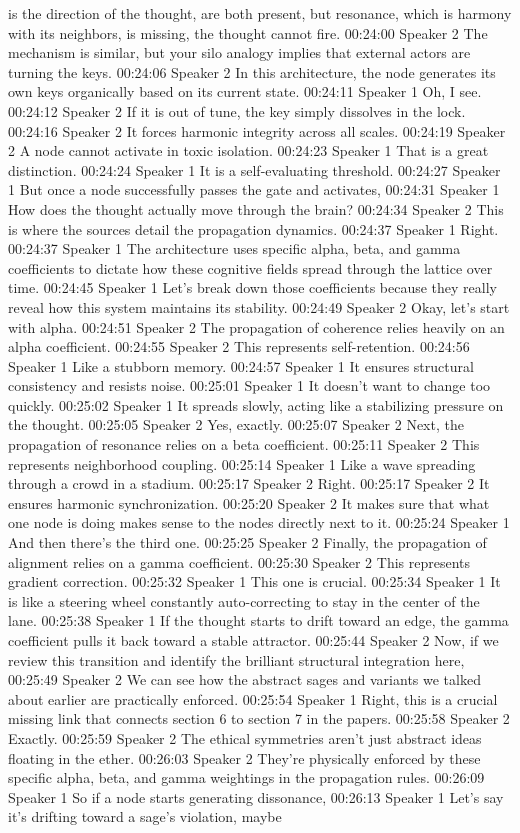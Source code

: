 is the direction of the thought, are both present, but resonance, which is harmony with its neighbors, is missing, the thought cannot fire. 00:24:00 Speaker 2 The mechanism is similar, but your silo analogy implies that external actors are turning the keys. 00:24:06 Speaker 2 In this architecture, the node generates its own keys organically based on its current state. 00:24:11 Speaker 1 Oh, I see. 00:24:12 Speaker 2 If it is out of tune, the key simply dissolves in the lock. 00:24:16 Speaker 2 It forces harmonic integrity across all scales. 00:24:19 Speaker 2 A node cannot activate in toxic isolation. 00:24:23 Speaker 1 That is a great distinction. 00:24:24 Speaker 1 It is a self-evaluating threshold. 00:24:27 Speaker 1 But once a node successfully passes the gate and activates, 00:24:31 Speaker 1 How does the thought actually move through the brain? 00:24:34 Speaker 2 This is where the sources detail the propagation dynamics. 00:24:37 Speaker 1 Right. 00:24:37 Speaker 1 The architecture uses specific alpha, beta, and gamma coefficients to dictate how these cognitive fields spread through the lattice over time. 00:24:45 Speaker 1 Let's break down those coefficients because they really reveal how this system maintains its stability. 00:24:49 Speaker 2 Okay, let's start with alpha. 00:24:51 Speaker 2 The propagation of coherence relies heavily on an alpha coefficient. 00:24:55 Speaker 2 This represents self-retention. 00:24:56 Speaker 1 Like a stubborn memory. 00:24:57 Speaker 1 It ensures structural consistency and resists noise. 00:25:01 Speaker 1 It doesn't want to change too quickly. 00:25:02 Speaker 1 It spreads slowly, acting like a stabilizing pressure on the thought. 00:25:05 Speaker 2 Yes, exactly. 00:25:07 Speaker 2 Next, the propagation of resonance relies on a beta coefficient. 00:25:11 Speaker 2 This represents neighborhood coupling. 00:25:14 Speaker 1 Like a wave spreading through a crowd in a stadium. 00:25:17 Speaker 2 Right. 00:25:17 Speaker 2 It ensures harmonic synchronization. 00:25:20 Speaker 2 It makes sure that what one node is doing makes sense to the nodes directly next to it. 00:25:24 Speaker 1 And then there's the third one. 00:25:25 Speaker 2 Finally, the propagation of alignment relies on a gamma coefficient. 00:25:30 Speaker 2 This represents gradient correction. 00:25:32 Speaker 1 This one is crucial. 00:25:34 Speaker 1 It is like a steering wheel constantly auto-correcting to stay in the center of the lane. 00:25:38 Speaker 1 If the thought starts to drift toward an edge, the gamma coefficient pulls it back toward a stable attractor. 00:25:44 Speaker 2 Now, if we review this transition and identify the brilliant structural integration here, 00:25:49 Speaker 2 We can see how the abstract sages and variants we talked about earlier are practically enforced. 00:25:54 Speaker 1 Right, this is a crucial missing link that connects section 6 to section 7 in the papers. 00:25:58 Speaker 2 Exactly. 00:25:59 Speaker 2 The ethical symmetries aren't just abstract ideas floating in the ether. 00:26:03 Speaker 2 They're physically enforced by these specific alpha, beta, and gamma weightings in the propagation rules. 00:26:09 Speaker 1 So if a node starts generating dissonance, 00:26:13 Speaker 1 Let's say it's drifting toward a sage's violation, maybe 